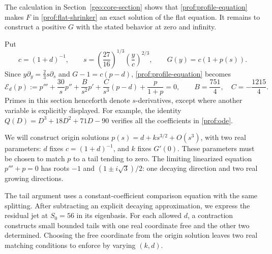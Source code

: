 The calculation in Section~\ref{geo:core-section} shows that
\eqref{prof:profile-equation} makes $F$ in
\eqref{prof:flat-shrinker} an exact solution of the flat equation.
It remains to construct a positive $G$ with the stated behavior at
zero and infinity.

Put
\begin{equation}\label{prof:change-variables}
 c=(1+d)^{-1},\qquad
 s=\left(\frac{27}{16}\right)^{1/3}\left(\frac yc\right)^{2/3},
 \qquad G(y)=c(1+p(s)).
\end{equation}
Since $y\partial_y=\frac23s\partial_s$ and $G-1=c(p-d)$,
\eqref{prof:profile-equation} becomes
\begin{equation}\label{prof:ode}
 \mathcal E_d(p):=
 p'''+\frac{30}{s}p''+\frac B{s^2}p'
       +\frac C{s^3}(p-d)+\frac p{1+p}=0,
 \qquad B=\frac{751}{4},\quad C=-\frac{1215}{4}.
\end{equation}
Primes in this section henceforth denote $s$-derivatives, except where
another variable is explicitly displayed.  For example, the identity
$Q(D)=D^3+18D^2+71D-90$ verifies all the coefficients in
\eqref{prof:ode}.

We will construct origin solutions
\(p(s)=d+ks^{3/2}+O(s^3)\), with two real parameters: \(d\) fixes
\(c=(1+d)^{-1}\), and \(k\) fixes \(G'(0)\).  These parameters must
be chosen to match \(p\) to a tail tending to zero.  The limiting
linearized equation \(p'''+p=0\) has roots \(-1\) and
\((1\pm i\sqrt3)/2\): one decaying direction and two real growing
directions.

The tail argument uses a constant-coefficient comparison equation
with the same splitting.  After subtracting an explicit decaying
approximation, we express the residual jet at \(S_0=56\) in its
eigenbasis.  For each allowed \(d\), a contraction constructs small
bounded tails with one real coordinate free and the other two
determined.  Choosing the free coordinate from the origin solution leaves two
real matching conditions to enforce by varying \((k,d)\).

